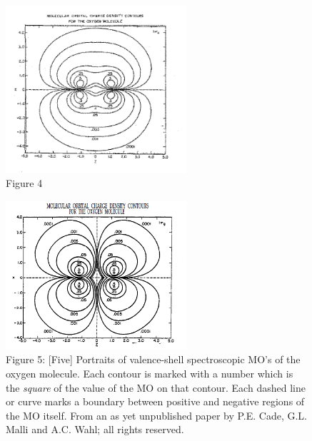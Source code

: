\documentclass[11pt]{memoir}
\begin{document}
\begin{figure}
	\begin{center}
		\includegraphics[width=0.6\textwidth]{images/mulliken_figure4.png}
	\end{center}
	\caption*{Figure 4}


\end{figure}


\begin{figure}
\begin{center}
\includegraphics[width=0.6\textwidth]{images/mulliken_figure5.png}
\end{center}
\caption*{Figure 5: [Five] Portraits of valence-shell spectroscopic MO's of the oxygen molecule.  Each contour is marked with a number which is the \emph{square} of the value of the MO on that contour.  Each dashed line or curve marks a boundary between positive and negative regions of the MO itself.  From an as yet unpublished paper by P.E. Cade, G.L. Malli and A.C. Wahl; all rights reserved.}
\end{figure}
\end{document}
